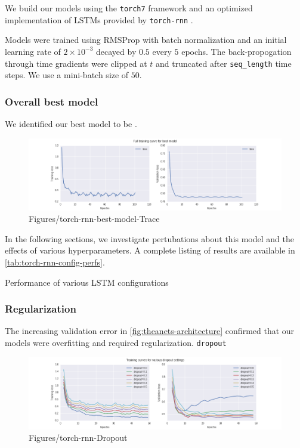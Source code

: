 \documentclass[dissertation.tex]{subfiles}
\begin{document}
We build our models using the \texttt{torch7} framework and
an optimized implementation of LSTMs provided by \texttt{torch-rnn} .

Models were trained using RMSProp  with batch normalization 
and an initial learning rate of $2 \times 10^{-3}$ decayed by $0.5$ every $5$
epochs. The back-propogation through time gradients were clipped
at $t$  and truncated after \texttt{seq\_length} time steps.
We use a mini-batch size of $50$.

\subsubsection{Overall best model}

We identified our best model to be .

\begin{figure}[htpb]
  \centering
  \includegraphics[width=1.0\linewidth]{Figures/torch-rnn-best-model-trace.png}
  \caption{Figures/torch-rnn-best-model-Trace}
  \label{fig:Figures/torch-rnn-best-model-trace}
\end{figure}

In the following sections, we investigate pertubations about this model and the
effects of various hyperparameters. A complete listing of results are available
in
\autoref{tab:torch-rnn-config-perfs}.
\begin{table}[htpb]
    \centering
    \caption{Performance of various LSTM configurations}
    \label{tab:torch-rnn-config-perfs}
    
\end{table}

\subsubsection{Regularization}

The increasing validation error in \autoref{fig:theanets-architecture} confirmed
that our models were overfitting and required regularization. \texttt{dropout}

\begin{figure}[htpb]
  \centering
  \includegraphics[width=1.0\linewidth]{Figures/torch-rnn-dropout.png}
  \caption{Figures/torch-rnn-Dropout}
  \label{fig:Figures/torch-rnn-dropout}
\end{figure}
\end{document}
